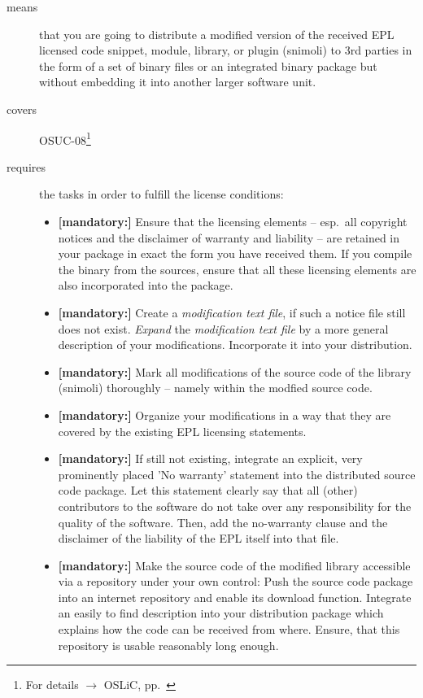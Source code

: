 \begin{description}
\item[means] that you are going to distribute a modified version of the received
EPL licensed code snippet, module, library, or plugin (snimoli) to 3rd
parties in the form of a set of binary files or an integrated binary package but
without embedding it into another larger software unit.
\item[covers] OSUC-08\footnote{For details $\rightarrow$ OSLiC, pp.\ \pageref{OSUC-08-DEF}}
\item[requires] the tasks in order to fulfill the license conditions:
\begin{itemize}

  \item \textbf{[mandatory:]} Ensure that the licensing elements -- esp.\ all
  copyright notices and the disclaimer of warranty and liability -- are retained
  in your package in exact the form you have received them. If you compile the
  binary from the sources, ensure that all these licensing elements are also
  incorporated into the package.

  \item \textbf{[mandatory:]} Create a \emph{modification text file}, if such a
  notice file still does not exist. \emph{Expand} the \emph{modification text
  file} by a more general description of your modifications. Incorporate it into
  your distribution.

  \item \textbf{[mandatory:]} Mark all modifications of the source code of the
  library (snimoli) thoroughly -- namely within the modfied source code.

  \item \textbf{[mandatory:]} Organize your modifications in a way that they are
  covered by the existing EPL licensing statements.
  
  \item \textbf{[mandatory:]} If still not existing, integrate an explicit, very
  prominently placed 'No warranty' statement into the distributed source code
  package. Let this statement clearly say that all (other) contributors to the
  software do not take over any responsibility for the quality of the software.
  Then, add the no-warranty clause and the disclaimer of the liability of the
  EPL itself into that file.
  
  \item \textbf{[mandatory:]} Make the source code of the modified library
  accessible via a repository under your own control: Push the source code
  package into an internet repository and enable its download function.
  Integrate an easily to find description into your distribution package which
  explains how the code can be received from where. Ensure, that this repository
  is usable reasonably long enough.
  

\end{itemize}
\end{description}
